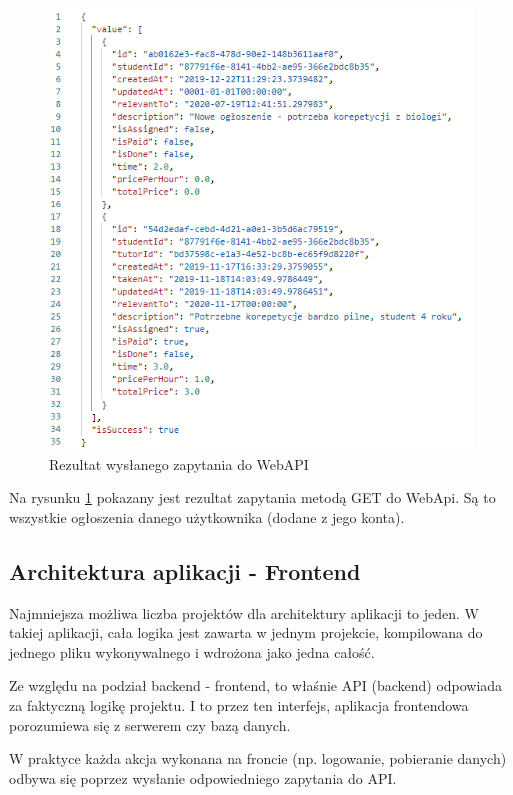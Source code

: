 \documentclass[12pt]{article}
\numberwithin{figure}{section}
\begin{document}
\begin{sloppypar}
        \begin{figure}[H] 
         	\centering
        	\includegraphics[width=.8\textwidth]{images/chapter_3/json-get.png}
        	\caption{Rezultat wysłanego zapytania do WebAPI}
        	\label{fig:json-get}
        \end{figure}
        
        Na rysunku \ref{fig:json-get} pokazany jest rezultat zapytania metodą GET do WebApi. Są to wszystkie ogłoszenia danego użytkownika (dodane z jego konta).
        
\clearpage
\subsection{Architektura aplikacji - Frontend}
Najmniejsza możliwa liczba projektów dla architektury aplikacji to jeden. W takiej aplikacji, cała logika jest zawarta w jednym projekcie, kompilowana do jednego pliku wykonywalnego i wdrożona jako jedna całość. 
    
Ze względu na podział backend - frontend, to właśnie API (backend) odpowiada za faktyczną logikę projektu. I to przez ten interfejs, aplikacja frontendowa porozumiewa się z serwerem czy bazą danych. 
    
W praktyce każda akcja wykonana na froncie (np. logowanie, pobieranie danych) odbywa się poprzez wysłanie odpowiedniego zapytania do API. 
    

\end{sloppypar}
\end{document}
